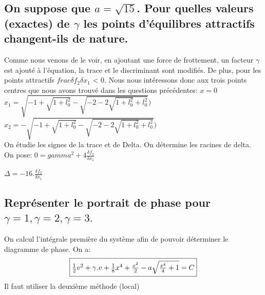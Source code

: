 \documentclass[10pt,a4paper]{article}
\begin{document}
\subsection{On suppose que $a=\sqrt{15}$. Pour quelles valeurs (exactes) de $\gamma$ les points d'équilibres attractifs changent-ils de nature.}

Comme nous venons de le voir, en ajoutant une force de frottement, un facteur $\gamma$ est ajouté à l'équation, la trace et le discriminant sont modifiés. 
De plus, pour les points attractifs $frac{\delta f_2}{\delta x_1}$ < 0.
Nous nous intéressons donc aux trois points centres que nous avons trouvé dans les questions précédentes:
$x=0$\\
$x_1=\sqrt{-1+\sqrt{1+l_0^2}-\sqrt{-2-2\sqrt{1+l_0^2}+l_0^2}})$\\
$x_2=-\sqrt{-1+\sqrt{1+l_0^2}-\sqrt{-2-2\sqrt{1+l_0^2}+l_0^2}})$\\

On étudie les signes de la trace et de Delta.
On détermine les racines de delta.
On pose:
$0 = gamma^2 + 4\frac{\delta f_2}{\delta x_1}$

$\Delta=-16.\frac{\delta f_2}{\delta x_1}$ 


\subsection{Représenter le portrait de phase pour $\gamma=1, \gamma=2, \gamma=3.$}
On calcul l'intégrale première du système afin de pouvoir déterminer le diagramme de phase. On a:
\[\fbox{$ \frac{1}{2}v^2 + \gamma.v + \frac{1}{8}x^4 + \frac{x^2}{2} - a\sqrt{\frac{x^4}{4} + 1} = C  $}\]
Il faut utiliser la deuxième méthode (local)
\end{document}

